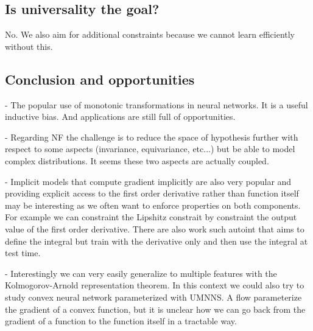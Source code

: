 \subsection{Is universality the goal?}
No. We also aim for additional constraints because we cannot learn efficiently without this.

\subsection{Conclusion and opportunities}
- The popular use of monotonic transformations in neural networks. It is a useful inductive bias. And applications are still full of opportunities.

- Regarding NF the challenge is to reduce the space of hypothesis further with respect to some aspects (invariance, equivariance, etc...) but be able to model complex distributions. It seems these two aspects are actually coupled.

- Implicit models that compute gradient implicitly are also very popular and providing explicit access to the first order derivative rather than function itself may be interesting as we often want to enforce properties on both components. For example we can constraint the Lipshitz constrait by constraint the output value of the first order derivative. There are also work such autoint that aims to define the integral but train with the derivative only and then use the integral at test time.

- Interestingly we can very easily generalize to multiple features with the Kolmogorov-Arnold representation theorem. In this context we could also try to study convex neural network parameterized with UMNNS. A flow parameterize the gradient of a convex function, but it is unclear how we can go back from the gradient of a function to the function itself in a tractable way.
